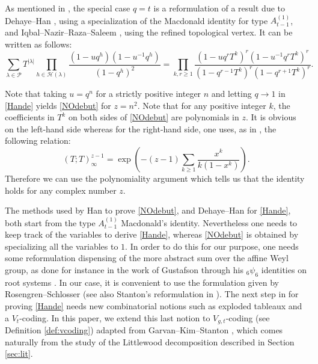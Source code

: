 \documentclass[11pt,letterpaper]{amsart}
\def\cch{\mathcal H}
\def\ccp{\mathcal P}
\numberwithin{equation}{section}
\numberwithin{df}{section}
\begin{document}
As mentioned in \cite{CRV,RW}, the special case $q=t$ is a reformulation of a result due to Dehaye--Han \cite{HD}, using a specialization of the Macdonald identity for type $A^{(1)}_{t-1}$, and Iqbal--Nazir--Raza--Saleem \cite{INRS}, using the refined topological vertex. It can be written as follows:
\begin{equation}\label{Hande}
\sum_{\lambda\in\ccp}T^{\lvert \lambda\rvert}\prod_{h\in\cch(\lambda)}\frac{(1-uq^h)(1-u^{-1}q^h)}{(1-q^h)^2}=\prod_{k,r\geq 1}\frac{(1-uq^rT^k)^r(1-u^{-1}q^rT^k)^r}{(1-q^{r-1}T^k)^r(1-q^{r+1}T^k)^r}.
\end{equation}

Note that taking $u=q^n$  for a strictly positive integer $n$ and letting $q\rightarrow 1$ in \eqref{Hande} yields \eqref{NOdebut} for $z=n^2$. Note that for any positive integer $k$, the coefficients in $T^k$ on both sides of \eqref{NOdebut} are polynomials in $z$. It is obvious on the left-hand side whereas for the right-hand side, one uses, as in \cite[$(3.10)$]{Han08}, the following relation:
$$ \left(T;T\right)_\infty^{z-1}=\exp\left(-(z-1)\sum_{k\geq 1}\frac{x^k}{k(1-x^k)}\right).$$
Therefore we can use the polynomiality argument which tells us that the identity holds for any complex number $z$.

The methods used by Han to prove \eqref{NOdebut}, and Dehaye--Han for \eqref{Hande}, both start from the type $A^{(1)}_{t-1}$ Macdonald's identity. Nevertheless one needs to keep track of the variables to derive \eqref{Hande}, whereas \eqref{NOdebut} is obtained by specializing all the variables to $1$. In order to  do this for our purpose, one needs some reformulation dispensing of the more abstract sum over the affine Weyl group, as done for instance in the work of Gustafson through his $_6\psi_6$ identities on root systems \cite{Gustafson}. In our case, it is convenient to use the formulation given by Rosengren--Schlosser \cite{RS} (see also Stanton's reformulation in \cite{Stanton}). The next step in \cite{HD} for proving \eqref{Hande} needs new combinatorial notions such as exploded tableaux and a $V_{t}$-coding. In this paper, we extend this last notion to $V_{g,t}$-coding (see Definition \ref{def:vcoding}) adapted from Garvan--Kim--Stanton \cite{GKS}, which comes naturally from the study of the Littlewood decomposition described in Section \ref{sec:lit}.
\end{document}
